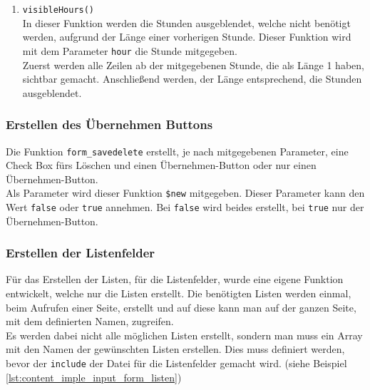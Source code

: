\begin{enumerate}
	\item \texttt{visibleHours()}\\
	In dieser Funktion werden die Stunden ausgeblendet, welche nicht benötigt werden, aufgrund der Länge einer vorherigen Stunde. Dieser Funktion wird mit dem Parameter \texttt{hour} die Stunde mitgegeben.\\
	Zuerst werden alle Zeilen ab der mitgegebenen Stunde, die als Länge 1 haben, sichtbar gemacht. Anschließend werden, der Länge entsprechend, die Stunden ausgeblendet.
	
	
	
\end{enumerate}

\subsubsection{Erstellen des Übernehmen Buttons} \label{sec:content_input_savedelete}
Die Funktion \texttt{form\_savedelete} erstellt, je nach mitgegebenen Parameter, eine Check Box fürs Löschen und einen Übernehmen-Button oder nur einen Übernehmen-Button.\\
Als Parameter wird dieser Funktion \texttt{\$new} mitgegeben. Dieser Parameter kann den Wert \texttt{false} oder \texttt{true} annehmen. Bei \texttt{false} wird beides erstellt, bei \texttt{true} nur der Übernehmen-Button.


\subsubsection{Erstellen der Listenfelder}
Für das Erstellen der Listen, für die Listenfelder, wurde eine eigene Funktion entwickelt, welche nur die Listen erstellt. Die benötigten Listen werden einmal, beim Aufrufen einer Seite, erstellt und auf diese kann man auf der ganzen Seite, mit dem definierten Namen, zugreifen.\\
Es werden dabei nicht alle möglichen Listen erstellt, sondern man muss ein Array mit den Namen der gewünschten Listen erstellen. Dies muss definiert werden, bevor der \texttt{include} der Datei für die Listenfelder gemacht wird. (siehe Beispiel \autoref{lst:content_imple_input_form_listen})


